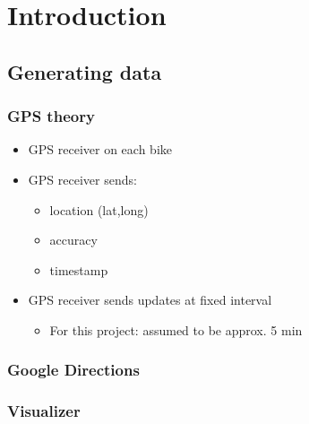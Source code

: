 \section{Introduction}

\subsection{Generating data}

\begin{frame}
\frametitle{GPS theory}

\begin{itemize}
\item GPS receiver on each bike
\item GPS receiver sends:
  \begin{itemize}
  \item location (lat,long)
  \item accuracy
  \item timestamp
  \end{itemize}
\item GPS receiver sends updates at fixed interval
  \begin{itemize}
  \item For this project: assumed to be approx. 5 min
  \end{itemize}
\end{itemize}

\end{frame}

\begin{frame}
\frametitle{Google Directions}

\end{frame}

\begin{frame}
\frametitle{Visualizer}

\end{frame}

